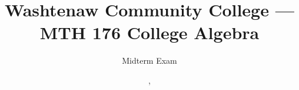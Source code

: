\makeatletter
\def\@maketitle{%
	\newpage
	\null
	\vspace*{-5em}
	\vskip 2em
	\begin{center}%
		\let \footnote \thanks
		{\LARGE \@title \par}%
		\vskip 1.5em%
		{\large
			\lineskip .5em%
			\begin{tabular}[t]{c}%
				\@author
			\end{tabular}\par}%
		\vskip 1em%
		{\large \@date}%
	\end{center}%
	\par
	\vskip 1.5em}
\makeatother

\title{Washtenaw Community College --- MTH 176 College Algebra}
\author{Midterm Exam }
\date{, }